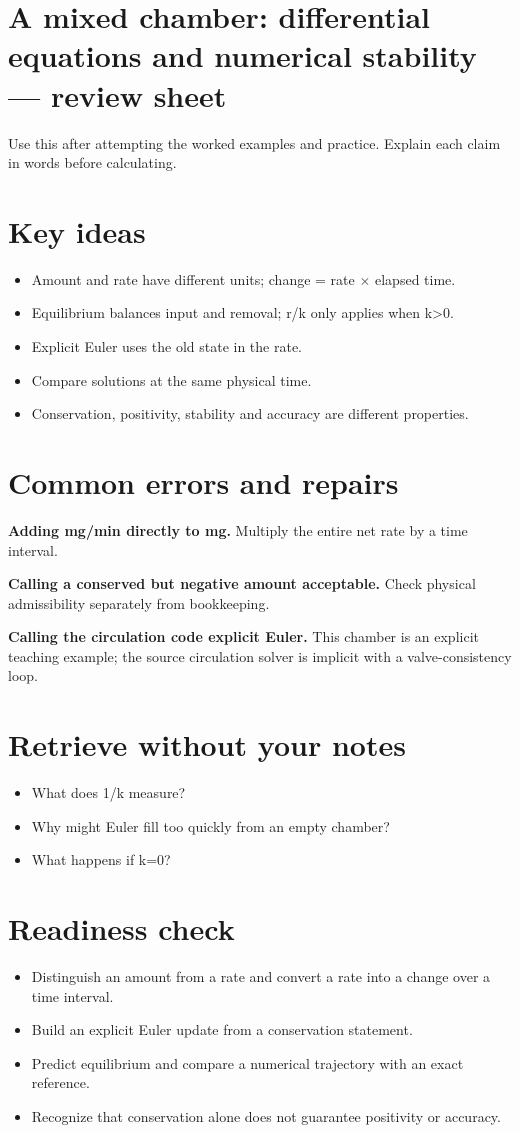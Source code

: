 \documentclass[11pt,letterpaper]{article}
\theoremstyle{definition}\newtheorem{definition}{Definition}\newtheorem{example}{Example}
\numberwithin{equation}{section}
\begin{document}
\section*{A mixed chamber: differential equations and numerical stability --- review sheet}
Use this after attempting the worked examples and practice. Explain each claim in words before calculating.

\section*{Key ideas}
\begin{itemize}
\item Amount and rate have different units; change =\allowbreak{} rate $\times$ elapsed time.
\item Equilibrium balances input and removal; r/k only applies when k>0.
\item Explicit Euler uses the old state in the rate.
\item Compare solutions at the same physical time.
\item Conservation, positivity, stability and accuracy are different properties.
\end{itemize}
\section*{Common errors and repairs}
\textbf{Adding mg/min directly to mg.} Multiply the entire net rate by a time interval.

\textbf{Calling a conserved but negative amount acceptable.} Check physical admissibility separately from bookkeeping.

\textbf{Calling the circulation code explicit Euler.} This chamber is an explicit teaching example; the source circulation solver is implicit with a valve-consistency loop.

\section*{Retrieve without your notes}
\begin{itemize}
\item What does 1/k measure?
\item Why might Euler fill too quickly from an empty chamber?
\item What happens if k=\allowbreak{}0?
\end{itemize}
\section*{Readiness check}
\begin{itemize}
\item Distinguish an amount from a rate and convert a rate into a change over a time interval.
\item Build an explicit Euler update from a conservation statement.
\item Predict equilibrium and compare a numerical trajectory with an exact reference.
\item Recognize that conservation alone does not guarantee positivity or accuracy.
\end{itemize}
\end{document}
